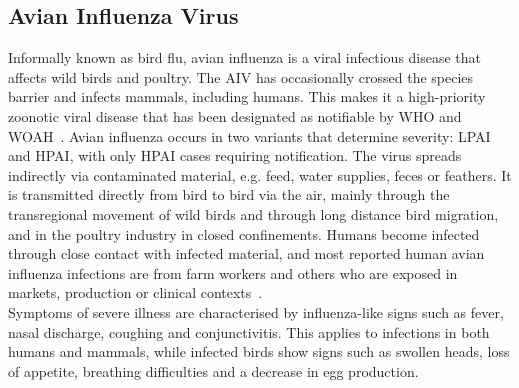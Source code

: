 \subsection{Avian Influenza Virus}
Informally known as bird flu, avian influenza is a viral infectious disease that affects wild birds and poultry. The \ac{AIV} has occasionally crossed the species barrier and infects mammals, including humans. This makes it a high-priority zoonotic viral disease that has been designated as notifiable by \ac{WHO} and \ac{WOAH}~\cite{woah2023list}. Avian influenza occurs in two variants that determine severity: \ac{LPAI} and \ac{HPAI}, with only \ac{HPAI} cases requiring notification. The virus spreads indirectly via contaminated material, e.g. feed, water supplies, feces or feathers. It is transmitted directly from bird to bird via the air, mainly through the transregional movement of wild birds and through long distance bird migration, and in the poultry industry in closed confinements. Humans become infected through close contact with infected material, and most reported human avian influenza infections are from farm workers and others who are exposed in markets, production or clinical contexts~\cite{webster1992evolution}. \\
Symptoms of severe illness are characterised by influenza-like signs such as fever, nasal discharge, coughing and conjunctivitis. This applies to infections in both humans and mammals, while infected birds show signs such as swollen heads, loss of appetite, breathing difficulties and a decrease in egg production.

